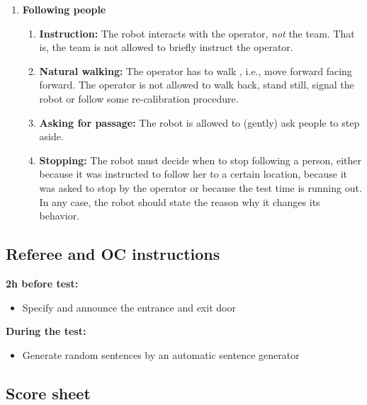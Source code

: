 \begin{enumerate}
\begin{enumerate}
	\end{enumerate}
	\item \textbf{Following people} 
	\begin{enumerate}
		\item \textbf{Instruction:} The robot interacts with the operator, \emph{not} the team. That is, the team is not allowed to briefly instruct the operator.
		\item \textbf{Natural walking:} The operator has to walk , i.e., move forward facing forward. The operator is not allowed to walk back, stand still, signal the robot or follow some re-calibration procedure.
		\item \textbf{Asking for passage:} The robot is allowed to (gently) ask people to step aside.
		\item \textbf{Stopping:} The robot must decide when to stop following a person, either because it was instructed to follow her to a certain location, because it was asked to stop by the operator or because the test time is running out. In any case, the robot should state the reason why it changes its behavior.
	\end{enumerate}
\end{enumerate}

\subsection{Referee and OC instructions}
\textbf{2h before test:}
\begin{itemize}
\item Specify and announce the entrance and exit door
\end{itemize}
\textbf{During the test:}
\begin{itemize}
\item Generate random sentences by an automatic sentence generator
\end{itemize}

\newpage
\subsection{Score sheet}


